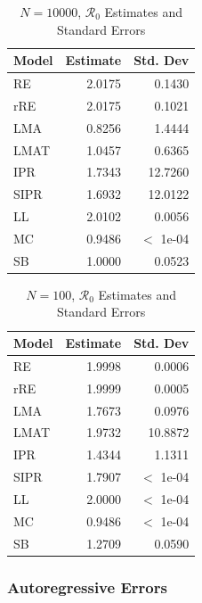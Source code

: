 \documentclass[12pt]{article}
\newcommand{\rr}{\ensuremath{\mathcal{R}_0}}
\begin{document}
\begin{table}[H]
	
	\centering
	\begin{tabular}[t]{l|r|r}
		\hline
		Model & Estimate & Std. Dev\\
		\hline
		RE & 2.0175 & 0.1430\\
		\hline
		rRE & 2.0175 & 0.1021\\
		\hline
		LMA & 0.8256 & 1.4444\\
		\hline
		LMAT & 1.0457 & 0.6365\\
		\hline
		IPR & 1.7343 & 12.7260\\
		\hline
		SIPR & 1.6932 & 12.0122\\
		\hline
		LL & 2.0102 & 0.0056\\
		\hline
		MC & 0.9486 & $<$ 1e-04\\
		\hline
		SB & 1.0000 & 0.0523\\
		\hline
	\end{tabular}
	\caption{$N = 10000$, $\rr$ Estimates and Standard Errors}
\end{table}

\begin{table}[H]
	
	\centering
	\begin{tabular}[t]{l|r|r}
		\hline
		Model & Estimate & Std. Dev\\
		\hline
		RE & 1.9998 & 0.0006\\
		\hline
		rRE & 1.9999 & 0.0005\\
		\hline
		LMA & 1.7673 & 0.0976\\
		\hline
		LMAT & 1.9732 & 10.8872\\
		\hline
		IPR & 1.4344 & 1.1311\\
		\hline
		SIPR & 1.7907 & $<$ 1e-04\\
		\hline
		LL & 2.0000 & $<$ 1e-04\\
		\hline
		MC & 0.9486 & $<$ 1e-04\\
		\hline
		SB & 1.2709 & 0.0590\\
		\hline
	\end{tabular}
	\caption{$N = 100$, $\rr$ Estimates and Standard Errors}
\end{table}

\subsubsection{Autoregressive Errors}
\end{document}
